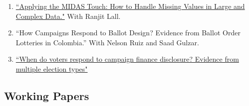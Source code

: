 \documentclass[11pt, a4paper]{article}
\begin{document}
\begin{enumerate}

\item \href{https://doi.org/10.33774/apsa-2020-3tk40-v3}{``Applying the MIDAS Touch: How to Handle Missing Values in Large and Complex Data."} With Ranjit Lall.

\item ``How Campaigns Respond to Ballot Design? Evidence from Ballot Order Lotteries in Colombia.'' With Nelson Ruiz and Saad Gulzar.

\item \href{https://ts-robinson.com/publication/robinson-voters-disclosure-2020/robinson-voters-disclosure-2020.pdf}{``When do voters respond to campaign finance disclosure? Evidence from multiple election types"}


\end{enumerate}

\subsection*{Working Papers}
\end{document}
